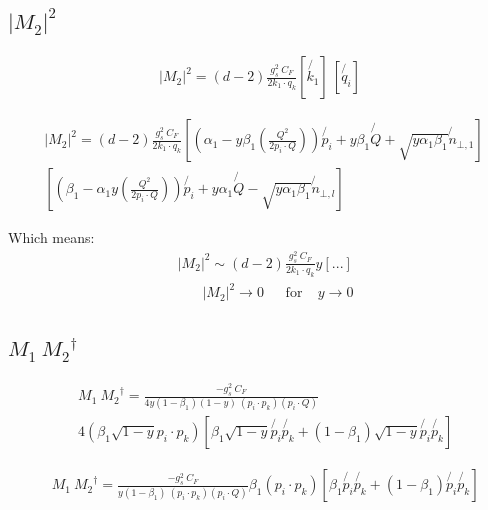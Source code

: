 \subsection*{$ |M_2|^2 $}

\begin{equation}
\begin{split}
|M_2|^2 =(d-2) \frac{g_s^2 \: C_F }{2k_1 \cdot q_k} [\not{k_1}]\: 
[\not{q_i} ]
\end{split}
\end{equation}

\begin{equation}
\begin{split}
&|M_2|^2 =(d-2) \frac{g_s^2 \: C_F}{2k_1 \cdot q_k} [(\alpha_1 -y\beta_1(\frac{Q^2}{2p_i \cdot Q})) \not{p_i} + y\beta_1\not{Q} + \sqrt{y\alpha_1\beta_1}\not{n}_{\bot,1}]\: \\
&[(\beta_1 -\alpha_1 y(\frac{Q^2}{2p_i \cdot Q}))\not{p_i} + y\alpha_1\not{Q} - \sqrt{y\alpha_1\beta_1}\not{n}_{\bot,l} ]
\end{split}
\end{equation}

Which means:
\begin{equation}
\begin{split}
&|M_2|^2 \sim(d-2) \frac{g_s^2 \: C_F}{2k_1 \cdot q_k} y[...]\\
&\:\:\:\:\:\:\:\:|M_2|^2\rightarrow 0 \:\:\:\:\:\:\:\text{for}\:\:\:\:\: y\rightarrow 0
\end{split}
\end{equation}

\subsection*{$ M_1\: {M_2}^{\dagger} $}


\begin{equation}
\begin{split}
&M_1\: {M_2}^{\dagger} = \frac{-g_s^2\: C_F }{4y(1-\beta_1) (1-y)\:(p_i \cdot p_k)(p_i \cdot Q)} \\
&4(\beta_1 \sqrt{1-y}{p_i}\cdot {{p_k}})[\beta_1 \sqrt{1-y}\not{p_i} \not{p_k}+ (1-\beta_1) \sqrt{1-y}\not{p_i}\not{p_k}]
\end{split}
\end{equation}

\begin{equation}
\begin{split}
&M_1\: {M_2}^{\dagger} = \frac{-g_s^2\: C_F }{y(1-\beta_1) \:(p_i \cdot p_k)(p_i \cdot Q)} \beta_1( {p_i}\cdot {{p_k}})[\beta_1 \not{p_i} \not{p_k}+ (1-\beta_1) \not{p_i}\not{p_k}]
\end{split}
\end{equation}

